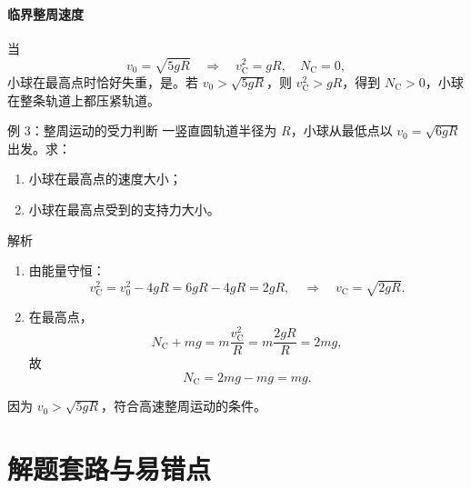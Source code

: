 \documentclass[a4paper,11pt]{ctexart}
\begin{document}
\paragraph*{临界整周速度}
当
\[
  v_0 = \sqrt{5gR}
  \quad\Rightarrow\quad
  v_{\mathrm{C}}^2 = gR,\quad N_{\mathrm{C}} = 0,
\]
小球在最高点时恰好失重，是。若 $v_0>\sqrt{5gR}$，则 $v_{\mathrm{C}}^2>gR$，得到 $N_{\mathrm{C}}>0$，小球在整条轨道上都压紧轨道。

\begin{examplebox}{例 3：整周运动的受力判断}
  一竖直圆轨道半径为 $R$，小球从最低点以 $v_0=\sqrt{6gR}$ 出发。求：
  \begin{enumerate}
    \item 小球在最高点的速度大小；
    \item 小球在最高点受到的支持力大小。
  \end{enumerate}
\end{examplebox}

\begin{proofbox}{解析}
  \begin{enumerate}
    \item 由能量守恒：
          \[
            v_{\mathrm{C}}^2 = v_0^2 - 4gR = 6gR - 4gR = 2gR,
            \quad\Rightarrow\quad
            v_{\mathrm{C}} = \sqrt{2gR}.
          \]
    \item 在最高点，
          \[
            N_{\mathrm{C}} + mg = m\frac{v_{\mathrm{C}}^2}{R}
            = m\frac{2gR}{R} = 2mg,
          \]
          故
          \[
            N_{\mathrm{C}} = 2mg - mg = mg.
          \]
  \end{enumerate}
  因为 $v_0>\sqrt{5gR}$，符合高速整周运动的条件。
\end{proofbox}

\clearpage
\section{解题套路与易错点}

\begin{roadmap}
\end{roadmap}
\end{document}
